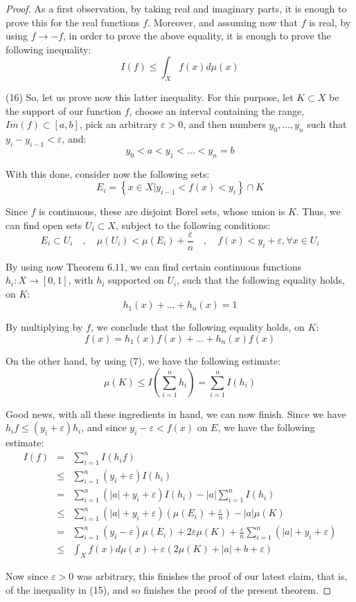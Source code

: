 \documentclass[12pt]{amsbook}
\begin{document}
\begin{proof}
As a first observation, by taking real and imaginary parts, it is enough to prove this for the real functions $f$. Moreover, and assuming now that $f$ is real, by using $f\to-f$, in order to prove the above equality, it is enough to prove the following inequality:
$$I(f)\leq\int_Xf(x)d\mu(x)$$

(16) So, let us prove now this latter inequality. For this purpose, let $K\subset X$ be the support of our function $f$, choose an interval containing the range, $Im(f)\subset[a,b]$, pick an arbitrary $\varepsilon>0$, and then numbers $y_0,\ldots,y_n$ such that $y_i-y_{i-1}<\varepsilon$, and:
$$y_0<a<y_1<\ldots<y_n=b$$

With this done, consider now the following sets:
$$E_i=\left\{x\in X\Big|y_{i-1}<f(x)<y_i\right\}\cap K$$

Since $f$ is continuous, these are disjoint Borel sets, whose union is $K$. Thus, we can find open sets $U_i\subset X$, subject to the following conditions:
$$E_i\subset U_i\quad,\quad \mu(U_i)<\mu(E_i)+\frac{\varepsilon}{n}\quad,\quad f(x)<y_i+\varepsilon,\forall x\in U_i$$

By using now Theorem 6.11, we can find certain continuous functions $h_i:X\to[0,1]$, with $h_i$ supported on $U_i$, such that the following equality holds, on $K$:
$$h_1(x)+\ldots+h_n(x)=1$$

By multiplying by $f$, we conclude that the following equality holds, on $K$:
$$f(x)=h_1(x)f(x)+\ldots+h_n(x)f(x)$$

On the other hand, by using (7), we have the following estimate:
$$\mu(K)\leq I\left(\sum_{i=1}^nh_i\right)=\sum_{i=1}^nI(h_i)$$

Good news, with all these ingredients in hand, we can now finish. Since we have $h_if\leq(y_i+\varepsilon)h_i$, and since $y_i-\varepsilon<f(x)$ on $E$, we have the following estimate:
\begin{eqnarray*}
I(f)
&=&\sum_{i=1}^nI(h_if)\\
&\leq&\sum_{i=1}^n(y_i+\varepsilon)I(h_i)\\
&=&\sum_{i=1}^n(|a|+y_i+\varepsilon)I(h_i)-|a|\sum_{i=1}^nI(h_i)\\
&\leq&\sum_{i=1}^n(|a|+y_i+\varepsilon)\left(\mu(E_i)+\frac{\varepsilon}{n}\right)-|a|\mu(K)\\
&=&\sum_{i=1}^n(y_i-\varepsilon)\mu(E_i)+2\varepsilon\mu(K)+\frac{\varepsilon}{n}\sum_{i=1}^n(|a|+y_i+\varepsilon)\\
&\leq&\int_Xf(x)d\mu(x)+\varepsilon\left(2\mu(K)+|a|+b+\varepsilon\right)
\end{eqnarray*}

Now since $\varepsilon>0$ was arbitrary, this finishes the proof of our latest claim, that is, of the inequality in (15), and so finishes the proof of the present theorem.
\end{proof}
\end{document}
